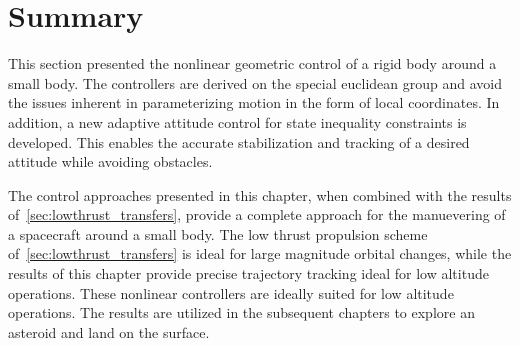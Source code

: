 \section{Summary}

This section presented the nonlinear geometric control of a rigid body around a small body.
The controllers are derived on the special euclidean group and avoid the issues inherent in parameterizing motion in the form of local coordinates.
In addition, a new adaptive attitude control for state inequality constraints is developed.
This enables the accurate stabilization and tracking of a desired attitude while avoiding obstacles.

The control approaches presented in this chapter, when combined with the results of~\cref{sec:lowthrust_transfers}, provide a complete approach for the manuevering of a spacecraft around a small body. 
The low thrust propulsion scheme of~\cref{sec:lowthrust_transfers} is ideal for large magnitude orbital changes, while the results of this chapter provide precise trajectory tracking ideal for low altitude operations.
These nonlinear controllers are ideally suited for low altitude operations.
The results are utilized in the subsequent chapters to explore an asteroid and land on the surface.
